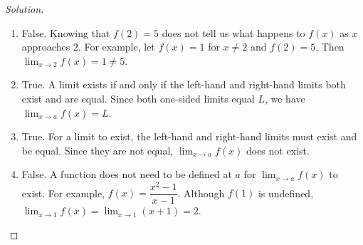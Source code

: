 \documentclass[12pt]{article}
\newenvironment{solution}{\begin{proof}[Solution]}{\end{proof}}
\begin{document}
\begin{enumerate}
		\bigskip
		
		\begin{solution}
		
		\begin{enumerate}
					
			\item False. Knowing that $f(2)=5$ does not tell us what
			happens to $f(x)$ as $x$ approaches $2$. For example, let
			$f(x)=1$ for $x\neq2$ and $f(2)=5$. Then
			$\displaystyle \lim_{x\to2}f(x)=1\neq5$.
			
			\item True. A limit exists if and only if the
			left-hand and right-hand limits both exist and are equal. Since
			both one-sided limits equal $L$, we have
			$\displaystyle \lim_{x\to a}f(x)=L.$
			
			\item True. For a limit to exist, the left-hand
			and right-hand limits must exist and be equal. Since they are
			not equal, $\displaystyle \lim_{x\to a}f(x)$ does not exist.
			
			
			\item False. A function does not need to be defined at
			$a$ for $\displaystyle \lim_{x\to a}f(x)$ to exist. For example, $f(x)=\dfrac{x^2-1}{x-1}.$ Although $f(1)$ is undefined,
			$\displaystyle
			\lim_{x\to1}f(x)
			=\lim_{x\to1}(x+1)=2.$
		\end{enumerate}
		\end{solution}
		
		
		\end{enumerate}
		
		
\end{document}
